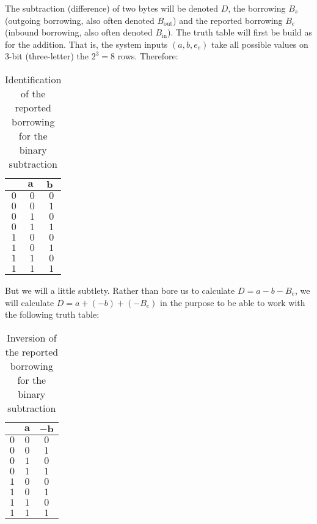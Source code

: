 	\pagebreak
	The subtraction (difference) of two bytes will be denoted $D$, the borrowing $B_s$ (outgoing borrowing, also often denoted $B_\text{out}$) and the reported borrowing $B_e$ (inbound borrowing, also often denoted $B_\text{in}$). The truth table will first be build as for the addition. That is, the system inputs $(a,b,e_e)$ take all possible values on $3$-bit (three-letter) the $2^3=8$ rows. Therefore:
	\begin{table}[H]
		\centering
		\begin{tabular}{|c|c|c|}
		\hline
		\rowcolor[HTML]{9B9B9B} 
		\multicolumn{1}{|l|}{\cellcolor[HTML]{9B9B9B}$\pmb{B_e}$} & \multicolumn{1}{l|}{\cellcolor[HTML]{9B9B9B}$\pmb{a}$} & \multicolumn{1}{l|}{\cellcolor[HTML]{9B9B9B}$\pmb{b}$} \\ \hline
		$0$ & $0$ & $0$ \\ \hline
		$0$ & $0$ & $1$ \\ \hline
		$0$ & $1$ & $0$ \\ \hline
		$0$ & $1$ & $1$ \\ \hline
		$1$ & $0$ & $0$ \\ \hline
		$1$ & $0$ & $1$ \\ \hline
		$1$ & $1$ & $0$ \\ \hline
		$1$ & $1$ & $1$ \\ \hline
		\end{tabular}
		\caption{Identification of the reported borrowing for the binary subtraction}
	\end{table}
	But we will a little subtlety. Rather than bore us to calculate $D=a-b-B_e$, we will calculate $D=a+(-b)+(-B_e)$ in the purpose to be able to work with the following truth table:
	\begin{table}[H]
		\centering
		\begin{tabular}{|c|c|c|}
		\hline
		\rowcolor[HTML]{9B9B9B} 
		\multicolumn{1}{|l|}{\cellcolor[HTML]{9B9B9B}$\pmb{-B_e}$} & \multicolumn{1}{l|}{\cellcolor[HTML]{9B9B9B}$\pmb{a}$} & \multicolumn{1}{l|}{\cellcolor[HTML]{9B9B9B}$\pmb{-b}$} \\ \hline
		$0$ & $0$ & $0$ \\ \hline
		$0$ & $0$ & $1$ \\ \hline
		$0$ & $1$ & $0$ \\ \hline
		$0$ & $1$ & $1$ \\ \hline
		$1$ & $0$ & $0$ \\ \hline
		$1$ & $0$ & $1$ \\ \hline
		$1$ & $1$ & $0$ \\ \hline
		$1$ & $1$ & $1$ \\ \hline
		\end{tabular}
		\caption{Inversion of the reported borrowing for the binary subtraction}
	\end{table}
